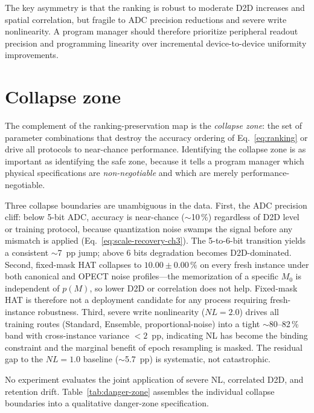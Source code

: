The key asymmetry is that the ranking is robust to moderate D2D increases and spatial correlation, but fragile to ADC precision reductions and severe write nonlinearity.  A program manager should therefore prioritize peripheral readout precision and programming linearity over incremental device-to-device uniformity improvements.


\section{Collapse zone}
\label{sec:collapse-zone}

The complement of the ranking-preservation map is the \emph{collapse zone}: the set of parameter combinations that destroy the accuracy ordering of Eq.~\ref{eq:ranking} or drive all protocols to near-chance performance.  Identifying the collapse zone is as important as identifying the safe zone, because it tells a program manager which physical specifications are \emph{non-negotiable} and which are merely performance-negotiable.



Three collapse boundaries are unambiguous in the data.  First, the ADC precision cliff: below 5-bit ADC, accuracy is near-chance ($\sim$10\,\%) regardless of D2D level or training protocol, because quantization noise swamps the signal before any mismatch is applied (Eq.~\ref{eq:scale-recovery-ch3}).  The 5-to-6-bit transition yields a consistent $\sim$7~pp jump; above 6 bits degradation becomes D2D-dominated.  Second, fixed-mask HAT collapses to $10.00\pm0.00\,\%$ on every fresh instance under both canonical and OPECT noise profiles---the memorization of a specific $M_{0}$ is independent of $p(M)$, so lower D2D or correlation does not help.  Fixed-mask HAT is therefore not a deployment candidate for any process requiring fresh-instance robustness.  Third, severe write nonlinearity ($NL=2.0$) drives all training routes (Standard, Ensemble, proportional-noise) into a tight $\sim$80--82\,\% band with cross-instance variance $<2$~pp, indicating NL has become the binding constraint and the marginal benefit of epoch resampling is masked.  The residual gap to the $NL=1.0$ baseline ($\sim$5.7~pp) is systematic, not catastrophic.

No experiment evaluates the joint application of severe NL, correlated D2D, and retention drift.  Table~\ref{tab:danger-zone} assembles the individual collapse boundaries into a qualitative danger-zone specification.

